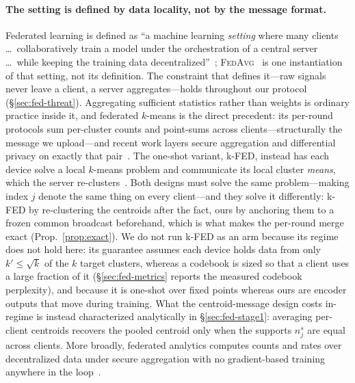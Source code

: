 \paragraph{The setting is defined by data locality, not by the message format.}
Federated learning is defined as ``a machine learning \emph{setting} where many clients
\dots\ collaboratively train a model under the orchestration of a central server \dots\
while keeping the training data decentralized''~\cite{kairouz2021advances};
\textsc{FedAvg}~\cite{mcmahan2017fedavg} is one instantiation of that setting, not its
definition. The constraint that defines it---raw signals never leave a client, a server
aggregates---holds throughout our protocol (\S\ref{sec:fed-threat}). Aggregating
sufficient statistics rather than weights is ordinary practice inside it, and federated
$k$-means is the direct precedent: its per-round protocols sum per-cluster counts and
point-sums across clients---structurally the message we upload---and recent work layers
secure aggregation and differential privacy on exactly that
pair~\cite{diaa2025fastlloyd}. The one-shot variant, k-FED, instead has each device solve a
local $k$-means problem and communicate its local cluster \emph{means}, which the server
re-clusters~\cite{dennis2021kfed}. Both designs must solve the same problem---making index
$j$ denote the same thing on every client---and they solve it differently: k-FED by
re-clustering the centroids after the fact, ours by anchoring them to a frozen common
broadcast beforehand, which is what makes the per-round merge exact
(Prop.~\ref{prop:exact}). We do not run k-FED as an arm because its regime does not hold
here: its guarantee assumes each device holds data from only $k'\le\sqrt{k}$ of the $k$
target clusters, whereas a codebook is sized so that a client uses a large fraction of it
(\S\ref{sec:fed-metrics} reports the measured codebook perplexity), and because it is
one-shot over fixed points whereas ours are encoder outputs that move during training. What
the centroid-message design costs in-regime is instead characterized analytically in
\S\ref{sec:fed-stage1}: averaging per-client centroids recovers the pooled centroid only
when the supports $n^{s}_{j}$ are equal across clients. More broadly, federated
analytics computes counts and rates over decentralized data under secure aggregation with
no gradient-based training anywhere in the loop~\cite{ramage2020fedanalytics,bonawitz2022privacy}.


